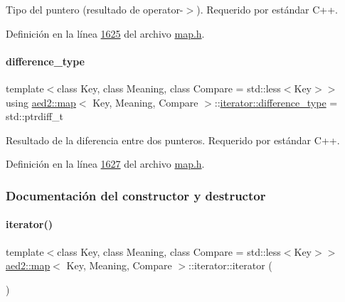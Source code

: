Tipo del puntero (resultado de operator-\/$>$). Requerido por estándar C++. 



Definición en la línea \hyperlink{map_8h_source_l01625}{1625} del archivo \hyperlink{map_8h_source}{map.\+h}.

\mbox{\label{classaed2_1_1map_1_1iterator_a803083681db1f62aed5138194abc1f06_a803083681db1f62aed5138194abc1f06}} 
\paragraph{\texorpdfstring{difference\+\_\+type}{difference\_type}}
{\footnotesize\ttfamily template$<$class Key, class Meaning, class Compare = std\+::less$<$\+Key$>$$>$ \\
using \hyperlink{classaed2_1_1map}{aed2\+::map}$<$ Key, Meaning, Compare $>$\+::\hyperlink{classaed2_1_1map_1_1iterator_a803083681db1f62aed5138194abc1f06_a803083681db1f62aed5138194abc1f06}{iterator\+::difference\+\_\+type} =  std\+::ptrdiff\+\_\+t}



Resultado de la diferencia entre dos punteros. Requerido por estándar C++. 



Definición en la línea \hyperlink{map_8h_source_l01627}{1627} del archivo \hyperlink{map_8h_source}{map.\+h}.



\subsubsection{Documentación del constructor y destructor}
\mbox{\label{classaed2_1_1map_1_1iterator_acdd790eb54216601a2e0591776004dba_acdd790eb54216601a2e0591776004dba}} 
\paragraph{\texorpdfstring{iterator()}{iterator()}\hspace{0.1cm}{\footnotesize\ttfamily [1/2]}}
{\footnotesize\ttfamily template$<$class Key, class Meaning, class Compare = std\+::less$<$\+Key$>$$>$ \\
\hyperlink{classaed2_1_1map}{aed2\+::map}$<$ Key, Meaning, Compare $>$\+::iterator\+::iterator (\begin{DoxyParamCaption}{ }\end{DoxyParamCaption})\hspace{0.3cm}{\ttfamily [inline]}}



